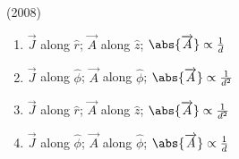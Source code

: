     \hfill{(2008)}

    \begin{center}
        
    \end{center}

    \begin{multicols}{2}
        \begin{enumerate}
            \item $\overrightarrow{J}$ along $\hat{r}$; $\overrightarrow{A}$ along $\hat{z}$; $\abs{\overrightarrow{A}}\propto\frac{1}{d}$
            \item $\overrightarrow{J}$ along $\hat{\phi}$; $\overrightarrow{A}$ along $\hat{\phi}$; $\abs{\overrightarrow{A}}\propto\frac{1}{d^2}$
            \item $\overrightarrow{J}$ along $\hat{r}$; $\overrightarrow{A}$ along $\hat{z}$; $\abs{\overrightarrow{A}}\propto\frac{1}{d^2}$
            \item $\overrightarrow{J}$ along $\hat{\phi}$; $\overrightarrow{A}$ along $\hat{\phi}$; $\abs{\overrightarrow{A}}\propto\frac{1}{d}$
        \end{enumerate}
    \end{multicols}

